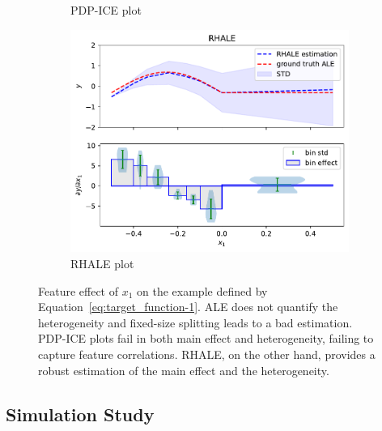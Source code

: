 \documentclass{article} %
\begin{document}
\begin{figure}
\begin{subfigure}{.32\textwidth}
  \caption{PDP-ICE plot}
  \label{fig:concept-figure-subfig-2-app}
\end{subfigure}
\begin{subfigure}{.32\textwidth}
  \centering
  \includegraphics[width=1\textwidth]{concept_figure/exp_1_rhale_0}
  \caption{RHALE plot}
  \label{fig:concept-figure-subfig-3-app}
\end{subfigure}
\caption{Feature effect of $x_1$ on the example defined by Equation~\ref{eq:target_function-1}.
ALE does not quantify the heterogeneity and fixed-size splitting leads to a bad estimation.
PDP-ICE plots fail in both main effect and heterogeneity, failing to capture feature correlations.
RHALE, on the other hand, provides a robust estimation of the main effect and the heterogeneity.}
\label{fig:concept-figure-app}
\end{figure}

\subsection{Simulation Study}
\label{sec:simulation-study}
\end{document}
